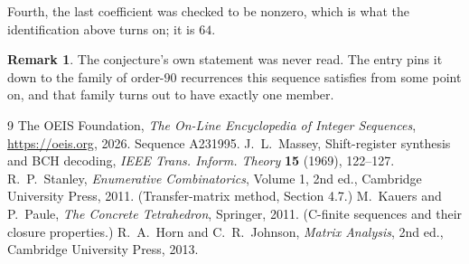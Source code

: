 \documentclass[11pt,a4paper]{article}
\theoremstyle{plain}
\theoremstyle{definition}
\newtheorem{remark}[theorem]{Remark}
\begin{document}
Fourth, the last coefficient was checked to be nonzero, which is what the identification above
turns on; it is $64$.

\begin{remark}
The conjecture's own statement was never read. The entry pins it down to the family of
order-$90$ recurrences this sequence satisfies from some point on, and that family turns
out to have exactly one member.
\end{remark}

\begin{thebibliography}{9}
 The OEIS Foundation, \emph{The On-Line Encyclopedia of Integer
Sequences}, \url{https://oeis.org}, 2026. Sequence A231995.
 J.~L.~Massey, Shift-register synthesis and BCH decoding, \emph{IEEE
Trans. Inform. Theory} \textbf{15} (1969), 122--127.
 R.~P.~Stanley, \emph{Enumerative Combinatorics}, Volume 1, 2nd ed.,
Cambridge University Press, 2011. (Transfer-matrix method, Section 4.7.)
 M.~Kauers and P.~Paule, \emph{The Concrete Tetrahedron}, Springer, 2011.
(C-finite sequences and their closure properties.)
 R.~A.~Horn and C.~R.~Johnson, \emph{Matrix Analysis}, 2nd ed., Cambridge
University Press, 2013.
\end{thebibliography}
\end{document}

